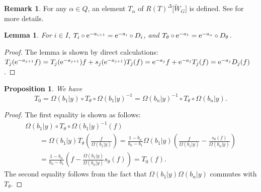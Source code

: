 \documentclass[pdftex]{sigma}
\numberwithin{equation}{section}
\newcommand{\reg}{\Delta}
\newcommand{\Rep}{{R(T)}}
\newtheorem{Lemma}[Theorem]{Lemma}
\newtheorem{Proposition}[Theorem]{Proposition}
\theoremstyle{definition}
\newtheorem{Remark}[Theorem]{Remark}
\begin{document}
\begin{Remark}
For any $\alpha\in Q$, an element $T_\alpha$ of $\Rep^\reg\big[\tilde{W}_G\big]$ is defined. See \cite[Section~2.2.4]{ISY} for more details.
\end{Remark}





\begin{Lemma}\label{lem:T_and_D}
For $i\in I$,
$T_{i}\circ {\rm e}^{-a_{i+1}}={\rm e}^{-a_{i}}\circ D_{i}$, and
$T_{\theta} \circ {\rm e}^{-a_1}={\rm e}^{-a_n}\circ D_{\theta}$.
\end{Lemma}
\begin{proof}
The lemma is shown by direct calculations:
$T_{j}({\rm e}^{-a_{j+1}}f)=T_{j}({\rm e}^{-a_{j+1}})f+s_{j}({\rm e}^{-a_{j+1}})T_{j}(f)\allowbreak
={\rm e}^{-a_{j}}f+{\rm e}^{-a_{j}}T_{j}(f)={\rm e}^{-a_{j}}D_{j}(f)$.
\end{proof}


\begin{Proposition}\label{prop:T_0}
 We have
 \[
 T_0=\Omega(b_1|y)\circ T_{\theta}\circ \Omega(b_1|y)^{-1}
 =\Omega(b_n|y)^{-1}\circ T_{\theta}\circ \Omega(b_n|y).
 \]
\end{Proposition}
\begin{proof}
The first equality is shown as follows:
\begin{gather*}
\Omega(b_1|y)\circ T_{\theta}\circ \Omega(b_1|y)^{-1}(f)\\
\qquad
=
\Omega(b_1|y)
T_{\theta}\left(
\frac{f}{\Omega(b_1|y)}
\right)
=
\frac{1-b_n}{b_n-b_1}
\Omega(b_1|y)
\left(
\frac{f}{\Omega(b_1|y)}
-
\frac{s_\theta(f)}{\Omega(b_n|y)}
\right)\\
\qquad
=
\frac{1-b_n}{b_n-b_1}
\left(
f
-
\frac{\Omega(b_1|y)}{\Omega(b_n|y)}s_{\theta}(f)
\right)=T_0(f).
\end{gather*}
The second equality follows from the fact that $\Omega(b_1|y)\Omega(b_n|y)$ commutes with $T_{\theta}$.
\end{proof}
\end{document}
